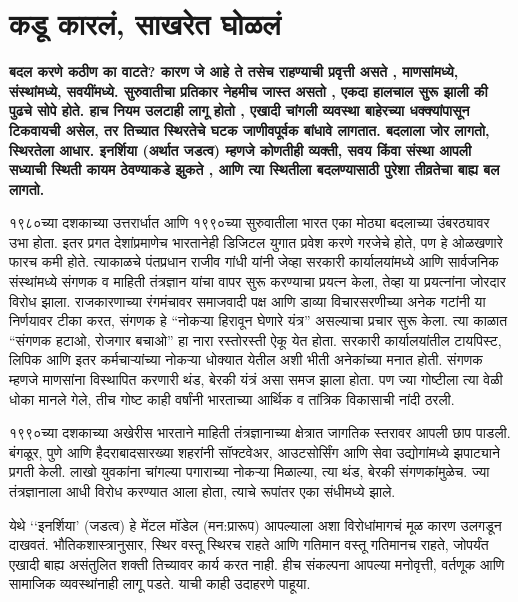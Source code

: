 \chapter{कडू कारलं, साखरेत घोळलं}

\textcolor{blue!60!black}{\textbf{बदल करणे कठीण का वाटते? कारण जे आहे ते तसेच राहण्याची प्रवृत्ती असते , माणसांमध्ये, संस्थांमध्ये, सवयींमध्ये. सुरुवातीचा प्रतिकार नेहमीच जास्त असतो , एकदा हालचाल सुरू झाली की पुढचे सोपे होते. हाच नियम उलटाही लागू होतो , एखादी चांगली व्यवस्था बाहेरच्या धक्क्यांपासून टिकवायची असेल, तर तिच्यात स्थिरतेचे घटक जाणीवपूर्वक बांधावे लागतात. बदलाला जोर लागतो, स्थिरतेला आधार. इनर्शिया (अर्थात जडत्व) म्हणजे कोणतीही व्यक्ती, सवय किंवा संस्था आपली सध्याची स्थिती कायम ठेवण्याकडे झुकते , आणि त्या स्थितीला बदलण्यासाठी पुरेशा तीव्रतेचा बाह्य बल लागतो.}}

१९८०च्या दशकाच्या उत्तरार्धात आणि १९९०च्या सुरुवातीला भारत एका मोठ्या बदलाच्या उंबरठ्यावर उभा होता. इतर प्रगत देशांप्रमाणेच भारतानेही डिजिटल युगात प्रवेश करणे गरजेचे होते, पण हे ओळखणारे फारच कमी होते. त्याकाळचे पंतप्रधान राजीव गांधी यांनी जेव्हा सरकारी कार्यालयांमध्ये आणि सार्वजनिक संस्थांमध्ये संगणक व माहिती तंत्रज्ञान यांचा वापर सुरू करण्याचा प्रयत्न केला, तेव्हा या प्रयत्नांना जोरदार विरोध झाला. राजकारणाच्या रंगमंचावर समाजवादी पक्ष आणि डाव्या विचारसरणीच्या अनेक गटांनी या निर्णयावर टीका करत, संगणक हे “नोकऱ्या हिरावून घेणारे यंत्र” असल्याचा प्रचार सुरू केला. त्या काळात “संगणक हटाओ, रोजगार बचाओ” हा नारा रस्तोरस्ती ऐकू येत होता. सरकारी कार्यालयांतील टायपिस्ट, लिपिक आणि इतर कर्मचाऱ्यांच्या नोकऱ्या धोक्यात येतील अशी भीती अनेकांच्या मनात होती. संगणक म्हणजे माणसांना विस्थापित करणारी थंड, बेरकी यंत्रं असा समज झाला होता. पण ज्या गोष्टीला त्या वेळी धोका मानले गेले, तीच गोष्ट काही वर्षांनी भारताच्या आर्थिक व तांत्रिक विकासाची नांदी ठरली.

१९९०च्या दशकाच्या अखेरीस भारताने माहिती तंत्रज्ञानाच्या क्षेत्रात जागतिक स्तरावर आपली छाप पाडली. बंगळूर, पुणे आणि हैदराबादसारख्या शहरांनी सॉफ्टवेअर, आउटसोर्सिंग आणि सेवा उद्योगांमध्ये झपाट्याने प्रगती केली. लाखो युवकांना चांगल्या पगाराच्या नोकऱ्या मिळाल्या, त्या थंड, बेरकी संगणकांमुळेच. ज्या तंत्रज्ञानाला आधी विरोध करण्यात आला होता, त्याचे रूपांतर एका संधीमध्ये झाले.

येथे ‘‘इनर्शिया’ (जडत्व) हे मेंटल मॉडेल (मन:प्रारूप) आपल्याला अशा विरोधांमागचं मूळ कारण उलगडून दाखवतं. भौतिकशास्त्रानुसार, स्थिर वस्तू स्थिरच राहते आणि गतिमान वस्तू गतिमानच राहते, जोपर्यंत एखादी बाह्य असंतुलित शक्ती तिच्यावर कार्य करत नाही. हीच संकल्पना आपल्या मनोवृत्ती, वर्तणूक आणि सामाजिक व्यवस्थांनाही लागू पडते. याची काही उदाहरणे पाहूया.

